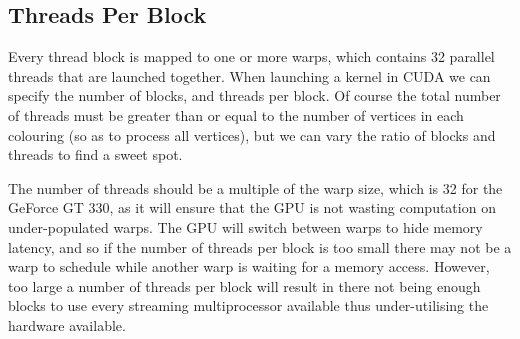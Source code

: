 \subsection{Threads Per Block}\label{sec:thread_size}
Every thread block is mapped to one or more warps, which contains 32 parallel threads that are launched together. When launching a kernel in CUDA we can specify the number of blocks, and threads per block. Of course the total number of threads must be greater than or equal to the number of vertices in each colouring (so as to process all vertices), but we can vary the ratio of blocks and threads to find a sweet spot.

The number of threads should be a multiple of the warp size, which is 32 for the GeForce GT 330, as it will ensure that the GPU is not wasting computation on under-populated warps. The GPU will switch between warps to hide memory latency\cite{threads_atomics}, and so if the number of threads per block is too small there may not be a warp to schedule while another warp is waiting for a memory access. However, too large a number of threads per block will result in there not being enough blocks to use every streaming multiprocessor available thus under-utilising the hardware available.